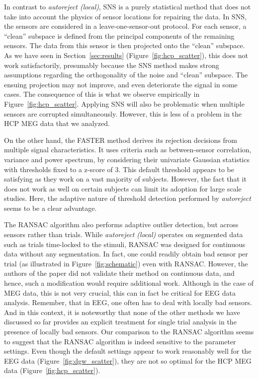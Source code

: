 In contrast to \emph{autoreject (local)}, SNS is a purely statistical method that does not take into account the physics of sensor locations for repairing the data. In SNS, the sensors are considered in a leave-one-sensor-out protocol. For each sensor, a ``clean'' subspace is defined from the principal components of the remaining sensors. The data from this sensor is then projected onto the ``clean'' subspace. As we have seen in Section~\ref{sec:results} (Figure~\ref{fig:hcp_scatter}), this does not work satisfactorily, presumably because the SNS method makes strong assumptions regarding the orthogonality of the noise and ``clean'' subspace. The ensuing projection may not improve, and even deteriorate the signal in some cases. The consequence of this is what we observe empirically in Figure~\ref{fig:hcp_scatter}. Applying SNS will also be problematic when multiple sensors are corrupted simultaneously. However, this is less of a problem in the HCP MEG data that we analyzed. 

On the other hand, the FASTER method derives its rejection decisions from multiple signal characteristics. It uses criteria such as between-sensor correlation, variance and power spectrum, by considering their univariate Gaussian statistics with thresholds fixed to a z-score of 3. This default threshold appears to be satisfying as they work on a vast majority of subjects. However, the fact that it does not work as well on certain subjects can limit its adoption for large scale studies. Here, the adaptive nature of threshold detection performed by \emph{autoreject} seems to be a clear advantage.

The RANSAC algorithm also performs adaptive outlier detection, but across sensors rather than trials. While \emph{autoreject (local)} operates on segmented data such as trials time-locked to the stimuli, RANSAC was designed for continuous data without any segmentation. In fact, one could readily obtain bad sensor per trial (as illustrated in Figure~\ref{fig:schematic}) even with RANSAC. However, the authors of the paper did not validate their method on continuous data, and hence, such a modification would require additional work. Although in the case of MEG data, this is not very crucial, this can in fact be critical for EEG data analysis. Remember, that in EEG, one often has to deal with locally bad sensors. And in this context, it is noteworthy that none of the other methods we have discussed so far provides an explicit treatment for single trial analysis in the presence of locally bad sensors. Our comparison to the RANSAC algorithm seems to suggest that the RANSAC algorithm is indeed sensitive to the parameter settings. Even though the default settings appear to work reasonably well for the EEG data (Figure~\ref{fig:dgw_scatter}), they are not so optimal for the HCP MEG data (Figure~\ref{fig:hcp_scatter}).

